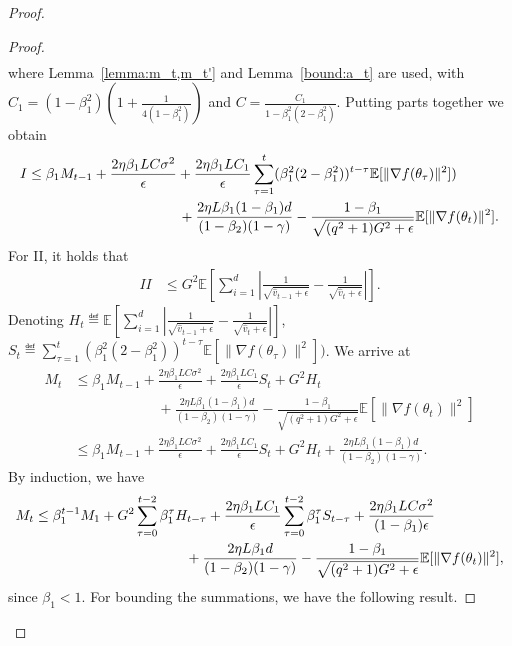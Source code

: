 \documentclass[11pt]{article}
\begin{document}
\begin{proof}
\begin{proof}
\begin{align*}
\end{align*}
where Lemma~\ref{lemma:m_t,m_t'} and Lemma~\ref{bound:a_t} are used, with $C_1=(1-\beta_1^2)(1+\frac{1}{4(1-\beta_1^2)})$ and $C=\frac{C_1}{1-\beta_1^2(2-\beta_1^2)}$. Putting parts together we obtain
\begin{align*}
    I&\leq \beta_1 M_{t-1}+\frac{2\eta \beta_1 LC\sigma^2}{\epsilon}+\frac{2\eta \beta_1 LC_1}{\epsilon} \sum_{\tau=1}^t (\beta_1^2(2-\beta_1^2))^{t-\tau}\mathbb E[\|\nabla f(\theta_\tau)\|^2])\\
    &\hspace{1.5in} +\frac{2\eta L\beta_1(1-\beta_1)d}{(1-\beta_2)(1-\gamma)}-\frac{1-\beta_1}{\sqrt{(q^2+1)G^2+\epsilon}}\mathbb E[\|\nabla f(\theta_t)\|^2].
\end{align*}
For II, it holds that
\begin{align*}
    II&\leq G^2 \mathbb E[\sum_{i=1}^d |\frac{1}{\sqrt{\hat v_{t-1}+\epsilon}}-\frac{1}{\sqrt{\hat v_t+\epsilon}}| ].
\end{align*}
Denoting $H_t\eqdef \mathbb E[\sum_{i=1}^d |\frac{1}{\sqrt{\hat v_{t-1}+\epsilon}}-\frac{1}{\sqrt{\hat v_t+\epsilon}}| ]$, $S_t\eqdef \sum_{\tau=1}^t (\beta_1^2(2-\beta_1^2))^{t-\tau}\mathbb E[\|\nabla f(\theta_\tau)\|^2])$. We arrive at
\begin{align*}
    M_t&\leq \beta_1 M_{t-1}+\frac{2\eta \beta_1 LC\sigma^2}{\epsilon}+\frac{2\eta \beta_1 LC_1}{\epsilon} S_t+G^2 H_t\\
    &\hspace{1in} +\frac{2\eta L\beta_1(1-\beta_1)d}{(1-\beta_2)(1-\gamma)}-\frac{1-\beta_1}{\sqrt{(q^2+1)G^2+\epsilon}}\mathbb E[\|\nabla f(\theta_t)\|^2]\\
    &\leq \beta_1 M_{t-1}+\frac{2\eta \beta_1 LC\sigma^2}{\epsilon}+\frac{2\eta \beta_1 LC_1}{\epsilon} S_t+G^2 H_t+\frac{2\eta L\beta_1(1-\beta_1)d}{(1-\beta_2)(1-\gamma)}.
\end{align*}
By induction, we have
\begin{align*}
    M_t&\leq \beta_1^{t-1} M_1+G^2 \sum_{\tau=0}^{t-2} \beta_1^\tau H_{t-\tau}+\frac{2\eta \beta_1 LC_1}{\epsilon} \sum_{\tau=0}^{t-2}\beta_1^\tau S_{t-\tau}+ \frac{2\eta \beta_1 LC\sigma^2}{(1-\beta_1)\epsilon}\\
    &\hspace{1.5in} +\frac{2\eta L\beta_1 d}{(1-\beta_2)(1-\gamma)}-\frac{1-\beta_1}{\sqrt{(q^2+1)G^2+\epsilon}}\mathbb E[\|\nabla f(\theta_t)\|^2],
\end{align*}
since $\beta_1<1$. For bounding the summations, we have the following result.



\end{proof}
\end{proof}
\end{document}
